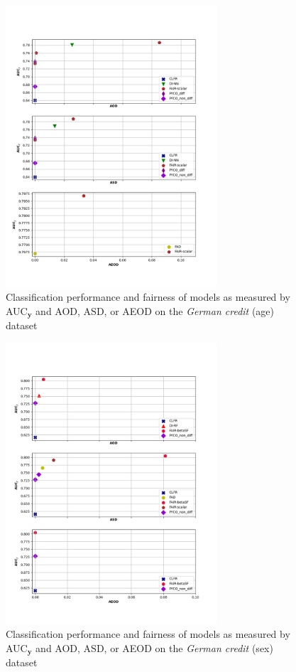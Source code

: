 \documentclass[preprint,12pt]{elsarticle}
\begin{document}
\begin{figure}
	\center
	\includegraphics[angle=0, width=0.7\textwidth]{Ger_age.png}
	\captionsetup{justification=centering}
	\caption{Classification performance and fairness of models as measured by AUC$_\mathbf{y}$ and AOD, ASD, or AEOD on the \textit{German credit} (age) dataset}
	\label{fig:Ger-sex-res1}
	\vskip -0.2in
\end{figure}

\begin{figure}
	\center
	\includegraphics[angle=0, width=0.7\textwidth]{Ger_sex.png}
	\captionsetup{justification=centering}
	\caption{Classification performance and fairness of models as measured by AUC$_\mathbf{y}$ and AOD, ASD, or AEOD on the \textit{German credit} (sex) dataset}
	\label{fig:Ger-age-res1}
	\vskip -0.2in
\end{figure}
\fi
\end{document}
